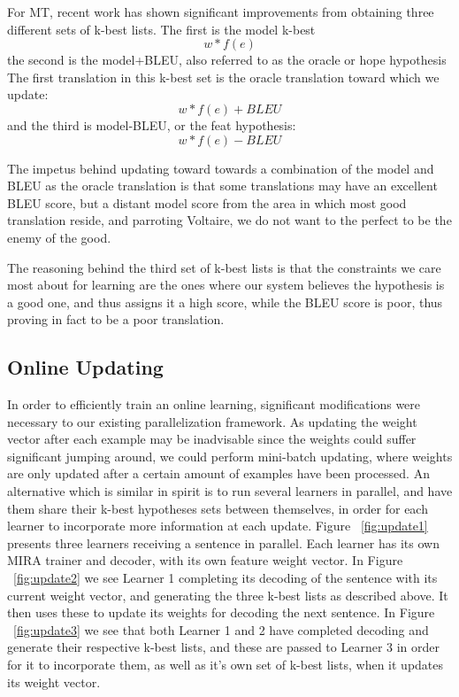 For MT, recent work has shown significant improvements from obtaining three different sets of k-best lists. The first is the model k-best
$$w*f(e) $$
 the second is the model+BLEU, also referred to as the oracle or hope hypothesis The first translation in this k-best set is the oracle translation toward which we update:
 $$w*f(e) + BLEU $$
 and the third is model-BLEU, or the feat hypothesis:
 $$w*f(e) - BLEU $$
 

The impetus behind updating toward towards a combination of the model and BLEU as the oracle translation is that some translations may have an excellent BLEU score, but a distant model score from the area in which most good translation reside, and parroting Voltaire, we do not want to the perfect to be the enemy of the good. 
 
The reasoning behind the third set of k-best lists is that the constraints we care most about for learning are the ones where our system believes the hypothesis is a good one, and thus assigns it a high score, while the BLEU score is poor, thus proving in fact to be a poor translation. 

\subsection{Online Updating}
In order to efficiently train an online learning, significant modifications were necessary to our existing parallelization framework. As updating the weight vector after each example may be inadvisable since the weights could suffer significant jumping around, we could perform mini-batch updating, where weights are only updated after a certain amount of examples have been processed. An alternative which is similar in spirit is to run several learners in parallel, and have them share their k-best hypotheses sets between themselves, in order for each learner to incorporate more information at each update. Figure ~\ref{fig:update1} presents three learners receiving a sentence in parallel. Each learner has its own MIRA trainer and decoder, with its own feature weight vector. In Figure ~\ref{fig:update2} we see Learner 1 completing its decoding of the sentence with its current weight vector, and generating the three k-best lists as described above. It then uses these to update its weights for decoding the next sentence. In Figure ~\ref{fig:update3} we see that both Learner 1 and 2 have completed decoding and generate their respective k-best lists, and these are passed to Learner 3 in order for it to incorporate them, as well as it's own set of k-best lists, when it updates its weight vector.

